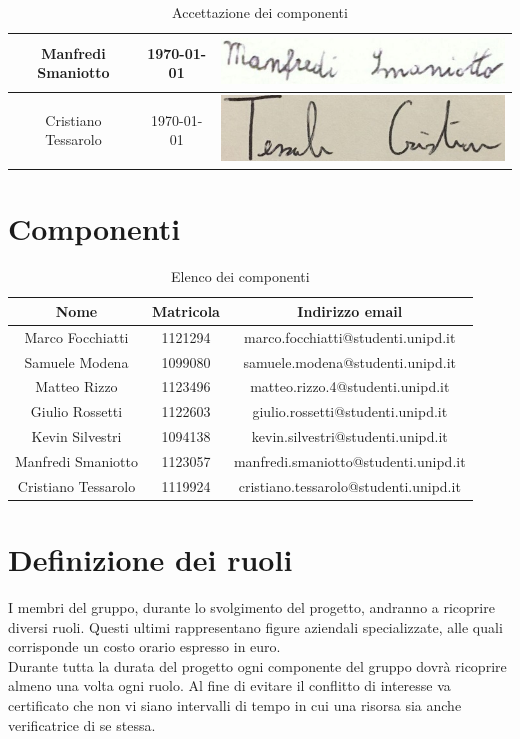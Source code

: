 \documentclass[./PianodiProgetto.tex]{subfiles}
\begin{document}
\begin{table}[H]
\begin{tabular}{|c|c|c|}
		Manfredi Smaniotto& \today &\includegraphics[scale=0.5]{img/firme/SmaniottoManfredi} \\ \hline
		Cristiano Tessarolo& \today &\includegraphics[scale=0.5]{img/firme/TessaroloCristiano} \\  
		\hline
	\end{tabular}
	\caption{Accettazione dei componenti}
\end{table}

\section{Componenti}
\begin{table}[H]
	\begin{tabular}{|c|c|c|}
	\hline
	Nome&Matricola&Indirizzo email \\ \hline
	Marco Focchiatti&1121294&marco.focchiatti@studenti.unipd.it  \\ \hline
	Samuele Modena&1099080&samuele.modena@studenti.unipd.it \\ \hline
	Matteo Rizzo&1123496&matteo.rizzo.4@studenti.unipd.it \\ \hline
	Giulio Rossetti&1122603&giulio.rossetti@studenti.unipd.it \\ \hline
	Kevin Silvestri&1094138&kevin.silvestri@studenti.unipd.it \\ \hline
	Manfredi Smaniotto&1123057&manfredi.smaniotto@studenti.unipd.it \\ \hline
	Cristiano Tessarolo&1119924&cristiano.tessarolo@studenti.unipd.it \\  
	\hline
	\end{tabular}
\caption{Elenco dei componenti}
\end{table}

\section{Definizione dei ruoli}
I membri del gruppo, durante lo svolgimento del progetto, andranno a ricoprire diversi ruoli. Questi ultimi rappresentano figure aziendali specializzate, alle quali corrisponde un costo orario espresso in euro. \\
Durante tutta la durata del progetto ogni componente del gruppo dovrà ricoprire almeno una volta ogni ruolo. Al fine di evitare il conflitto di interesse va certificato che non vi siano intervalli di tempo in cui una risorsa sia anche verificatrice di se stessa.
\end{document}
